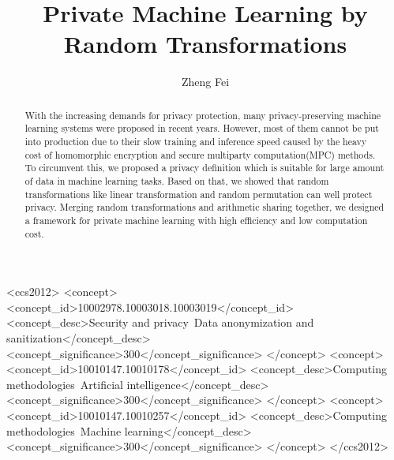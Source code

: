 \documentclass[sigconf, anonymous]{acmart}
\begin{document}
\title{Private Machine Learning by Random Transformations}

\author{Zheng Fei}


\renewcommand{\shortauthors}{Zheng Fei, et al.}

\begin{abstract}
  With the increasing demands for privacy protection, many privacy-preserving machine learning systems were proposed in recent years. However, most of them cannot be put into production due to their slow training and inference speed caused by the heavy cost of homomorphic encryption and secure multiparty computation(MPC) methods. To circumvent this, we proposed a privacy definition which is suitable for large amount of data in machine learning tasks. Based on that, we showed that random transformations like linear transformation and random permutation can well protect privacy. Merging random transformations and arithmetic sharing together, we designed a framework for private machine learning with high efficiency and low computation cost.
\end{abstract}

\begin{CCSXML}
  <ccs2012>
     <concept>
         <concept_id>10002978.10003018.10003019</concept_id>
         <concept_desc>Security and privacy~Data anonymization and sanitization</concept_desc>
         <concept_significance>300</concept_significance>
         </concept>
     <concept>
         <concept_id>10010147.10010178</concept_id>
         <concept_desc>Computing methodologies~Artificial intelligence</concept_desc>
         <concept_significance>300</concept_significance>
         </concept>
     <concept>
         <concept_id>10010147.10010257</concept_id>
         <concept_desc>Computing methodologies~Machine learning</concept_desc>
         <concept_significance>300</concept_significance>
     </concept>
  </ccs2012>
\end{CCSXML}
  
\end{document}
